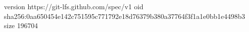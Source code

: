 version https://git-lfs.github.com/spec/v1
oid sha256:0aa650454e142c751595c771792e18d76379b380a37764f3f1a1e0bb1e4498b3
size 196704
